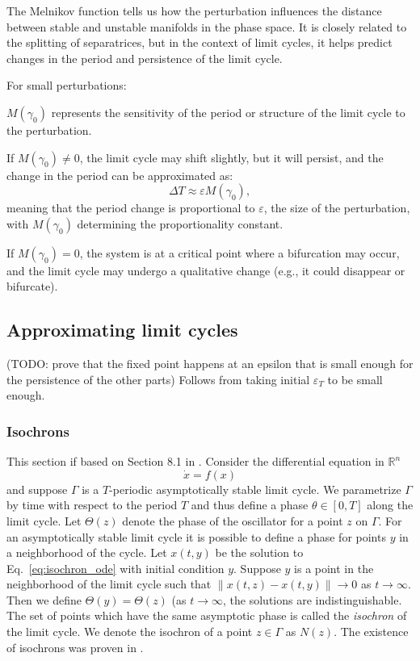 \documentclass{article}
\newcommand{\ascomment}[1]{\textcolor{ascolor}{(#1)}}
\theoremstyle{definition} \newtheorem{definition}{Definition}
\theoremstyle{remark} \newtheorem{remark}{Remark}
\newcommand{\reals}{\mathbb{R}}
\newcounter{ct}
\begin{document}
The Melnikov function tells us how the perturbation influences the distance between stable and unstable manifolds in the phase space. It is closely related to the splitting of separatrices, but in the context of limit cycles, it helps predict changes in the period and persistence of the limit cycle.

For small perturbations:

\(M(\gamma_0)\) represents the sensitivity of the period or structure of the limit cycle to the perturbation.

If \(M(\gamma_0) \neq 0\), the limit cycle may shift slightly, but it will persist, and the change in the period can be approximated as:
\[
\Delta T \approx \varepsilon M(\gamma_0),
\]
meaning that the period change is proportional to \(\varepsilon\), the size of the perturbation, with \(M(\gamma_0)\) determining the proportionality constant.

If \(M(\gamma_0) = 0\), the system is at a critical point where a bifurcation may occur, and the limit cycle may undergo a qualitative change (e.g., it could disappear or bifurcate).


\subsection{Approximating limit cycles}\label{sec:lc_extras}
\ascomment{TODO: prove that the fixed point happens at an epsilon that is small enough for the persistence of the other parts}
Follows from taking initial $\varepsilon_T$ to be small enough.


\subsubsection{Isochrons}%
This section if based on Section 8.1 in \citep{ermentrout2010mathematical}.
Consider the differential equation in $\reals^n$
\begin{equation}\label{eq:isochron_ode}
\dot x = f(x)
\end{equation}
and suppose $\Gamma$ is a $T$-periodic asymptotically stable limit cycle.
We parametrize $\Gamma$ by time with respect to the period $T$ and thus define a phase $\theta\in[0,T]$ along the limit cycle.
Let $\Theta(z)$ denote the phase of the oscillator for a point $z$ on $\Gamma$.
For an asymptotically stable limit cycle it is possible to define a phase for points $y$ in a neighborhood of the cycle.
Let $x(t,y)$ be the solution to Eq.~\ref{eq:isochron_ode} with initial condition $y$. 
Suppose $y$ is a point in the neighborhood of the limit cycle such that $\|x(t,z) - x(t,y)\|\rightarrow 0$ as $t\rightarrow \infty$.
Then we define $\Theta(y) = \Theta(z)$ (as $t\rightarrow\infty$, the solutions are indistinguishable.
The set of points which have the same asymptotic phase is called the \emph{isochron} of the limit cycle.
We denote the isochron of a point $z\in \Gamma$ as $N(z) $.
The existence of isochrons was proven in \citep{guckenheimer1975isochrons}.
\end{document}
